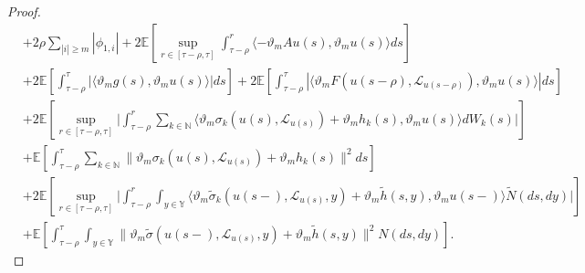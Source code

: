 \documentclass[11pt]{article}
\numberwithin{equation}{section}
\theoremstyle{plain}
\begin{document}
\begin{proof}
\begin{align}
        & + 2 \rho \sum_{|i| \ge m} |\phi_{1,i}|
          + 2 \mathbb{E}
              \left[ \sup_{r \in [\tau-\rho,\tau]}
                        \int_{\tau-\rho}^{r}
                     \langle -\vartheta_m A u(s), \vartheta_m u(s)
                     \rangle ds
              \right]  \nonumber \\
        & + 2 \mathbb{E}
                 \left[ \int_{\tau-\rho}^{\tau}
                              \left|
                                     \langle \vartheta_m g(s), \vartheta_m u(s)
                                     \rangle
                              \right| ds
                 \right]
          + 2 \mathbb{E}
                        \left[ \int_{\tau-\rho}^{\tau}
                                  \left|
                                         \langle \vartheta_m F(u(s-\rho), \mathcal{L}_{u(s-\rho)}),
                                                 \vartheta_m u(s)
                                         \rangle
                                  \right| ds
                        \right]  \nonumber\\
        & + 2 \mathbb{E}
                 \left[ \sup_{r \in [\tau-\rho,\tau]}
                                \Big| \int_{\tau-\rho}^{r} \sum_{k \in \mathbb{N} }
                                      \langle \vartheta_m \sigma_k(u(s),\mathcal{L}_{u(s)}) + \vartheta_m h_k(s),
                                              \vartheta_m u(s)
                                      \rangle dW_k(s)
                                \Big|
                 \right]  \nonumber\\
        & + \mathbb{E}
               \left[ \int_{\tau-\rho}^{\tau}
                         \sum_{k \in \mathbb{N} }
                            \|\vartheta_m \sigma_k(u(s),\mathcal{L}_{u(s)})
                               + \vartheta_m h_k(s) \|^2 ds
               \right]  \nonumber\\
        & + 2 \mathbb{E}
               \left[ \sup_{r\in [\tau-\rho,\tau]}
                         \Big| \int_{\tau-\rho}^{r}
                                      \int_{y \in \mathbb{Y} }
                                          \langle \vartheta_m 
                                                             \widetilde{\sigma}_k(u(s-), \mathcal{L}_{u(s)}, y)
                                                       + \vartheta_m \widetilde{h}(s, y),
                                                \vartheta_m u(s-)
                                        \rangle \widetilde{N}(ds,dy)
                         \Big|
              \right]  \nonumber\\
        & + \mathbb{E}
               \left[ \int_{\tau-\rho}^{\tau}
                            \int_{y \in \mathbb{Y} }
                                \| \vartheta_m \widetilde{\sigma}(u(s-), \mathcal{L}_{u(s)}, y) 
                                   + \vartheta_m \widetilde{h}(s, y) 
                                \|^2 N(ds,dy)
               \right].
 \end{align}


\end{proof}
\end{document}

